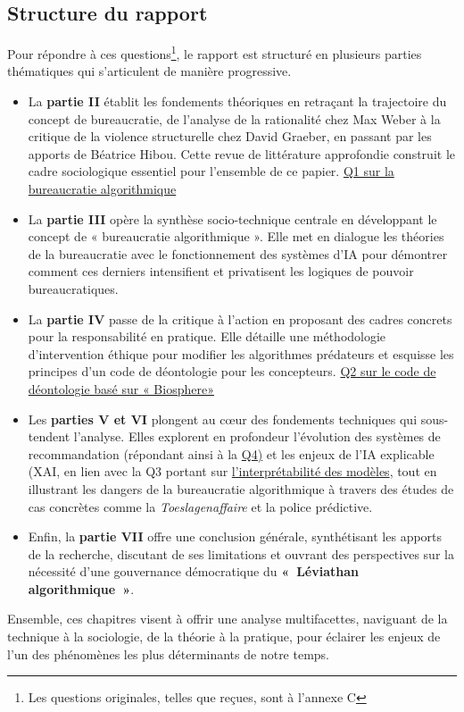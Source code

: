 \subsection{Structure du rapport}
Pour répondre à ces questions\footnote{Les questions originales, telles que reçues, sont à l'annexe C}, le rapport est structuré en plusieurs parties thématiques qui s'articulent de manière progressive.
\begin{itemize}[label=\S]
    \item La \textbf{partie II} établit les fondements théoriques en retraçant la trajectoire du concept de bureaucratie, de l'analyse de la rationalité chez Max Weber à la critique de la violence structurelle chez David Graeber, en passant par les apports de Béatrice Hibou. Cette revue de littérature approfondie construit le cadre sociologique essentiel pour l'ensemble de ce papier. \hyperref[annexe:question1]{Q1 sur la bureaucratie algorithmique}
    \item La \textbf{partie III} opère la synthèse socio-technique centrale en développant le concept de « bureaucratie algorithmique ». Elle met en dialogue les théories de la bureaucratie avec le fonctionnement des systèmes d'IA pour démontrer comment ces derniers intensifient et privatisent les logiques de pouvoir bureaucratiques.
    \item La \textbf{partie IV} passe de la critique à l'action en proposant des cadres concrets pour la responsabilité en pratique. Elle détaille une méthodologie d'intervention éthique pour modifier les algorithmes prédateurs et esquisse les principes d'un code de déontologie pour les concepteurs. \hyperref[annexe:question2]{Q2 sur le code de déontologie basé sur « Biosphere»}
    \item Les \textbf{parties V et VI} plongent au cœur des fondements techniques qui sous-tendent l'analyse. Elles explorent en profondeur l'évolution des systèmes de recommandation (répondant ainsi à la \hyperref[annexe:question4]{Q4)} et les enjeux de l'IA explicable (XAI, en lien avec la Q3 portant sur \hyperref[annexe:question4]{l'interprétabilité des modèles}, tout en illustrant les dangers de la bureaucratie algorithmique à travers des études de cas concrètes comme la \textit{Toeslagenaffaire} et la police prédictive.
    \item Enfin, la \textbf{partie VII} offre une conclusion générale, synthétisant les apports de la recherche, discutant de ses limitations et ouvrant des perspectives sur la nécessité d'une gouvernance démocratique du \textbf{«~Léviathan algorithmique~»}.
\end{itemize}
\clearpage
Ensemble, ces chapitres visent à offrir une analyse multifacettes, naviguant de la technique à la sociologie, de la théorie à la pratique, pour éclairer les enjeux de l'un des phénomènes les plus déterminants de notre temps.

